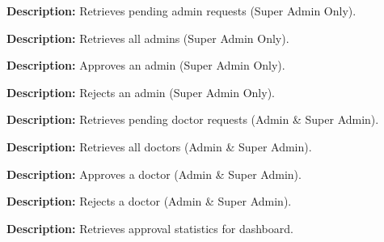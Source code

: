 \documentclass{article}
\begin{document}
\begin{tcolorbox}[title=\textcolor{accent}{GET} /api/admin/approvals/admins/pending]
\textbf{Description:} Retrieves pending admin requests (Super Admin Only).
\end{tcolorbox}

\begin{tcolorbox}[title=\textcolor{accent}{GET} /api/admin/approvals/admins/all]
\textbf{Description:} Retrieves all admins (Super Admin Only).
\end{tcolorbox}

\begin{tcolorbox}[title=\textcolor{accent}{POST} /api/admin/approvals/admins/:adminId/approve]
\textbf{Description:} Approves an admin (Super Admin Only).
\end{tcolorbox}

\begin{tcolorbox}[title=\textcolor{accent}{POST} /api/admin/approvals/admins/:adminId/reject]
\textbf{Description:} Rejects an admin (Super Admin Only).
\end{tcolorbox}

\begin{tcolorbox}[title=\textcolor{accent}{GET} /api/admin/approvals/doctors/pending]
\textbf{Description:} Retrieves pending doctor requests (Admin \& Super Admin).
\end{tcolorbox}

\begin{tcolorbox}[title=\textcolor{accent}{GET} /api/admin/approvals/doctors/all]
\textbf{Description:} Retrieves all doctors (Admin \& Super Admin).
\end{tcolorbox}

\begin{tcolorbox}[title=\textcolor{accent}{POST} /api/admin/approvals/doctors/:doctorId/approve]
\textbf{Description:} Approves a doctor (Admin \& Super Admin).
\end{tcolorbox}

\begin{tcolorbox}[title=\textcolor{accent}{POST} /api/admin/approvals/doctors/:doctorId/reject]
\textbf{Description:} Rejects a doctor (Admin \& Super Admin).
\end{tcolorbox}

\begin{tcolorbox}[title=\textcolor{accent}{GET} /api/admin/approvals/statistics]
\textbf{Description:} Retrieves approval statistics for dashboard.
\end{tcolorbox}
\end{document}

